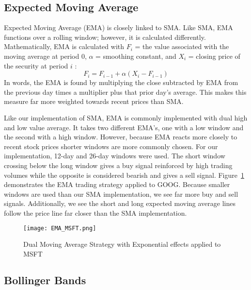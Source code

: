 \documentclass[../thesis.tex]{subfiles}
\begin{document}
\subsection{Expected Moving Average}

Expected Moving Average (EMA) is closely linked to SMA. Like SMA, EMA functions over a rolling window; however, it is calculated differently. Mathematically, EMA is calculated with $F_i$ = the value associated with the moving average at period 0, $\alpha$ = smoothing constant, and $X_i$ = closing price of the security at period $i$ \cite{James1968}:  \[F_i = F_{i-1} +\alpha(X_i - F_{i-1})\]  In words, the EMA is found by multiplying the close subtracted by EMA from the previous day times a multiplier plus that prior day's average. This makes this measure far more weighted towards recent prices than SMA.

Like our implementation of SMA, EMA is commonly implemented with dual high and low value average. It takes two different EMA's, one with a low window and the second with a high window. However, because EMA reacts more closely to recent stock prices shorter windows are more commonly chosen. For our implementation, 12-day and 26-day windows were used. The short window crossing below the long window gives a buy signal reinforced by high trading volumes while the opposite is considered bearish and gives a sell signal. Figure~\ref{EMAfigure} demonstrates the EMA trading strategy applied to GOOG. Because smaller windows are used than our SMA implementation, we see far more buy and sell signals. Additionally, we see the short and long expected moving average lines follow the price line far closer than the SMA implementation.

\begin{figure}[h]
\centering
\texttt{[image: EMA\_MSFT.png]}
\caption{Dual Moving Average Strategy with Exponential effects applied to MSFT \label{overflow}}
\label{EMAfigure}
\end{figure}

\subsection{Bollinger Bands}
\end{document}
